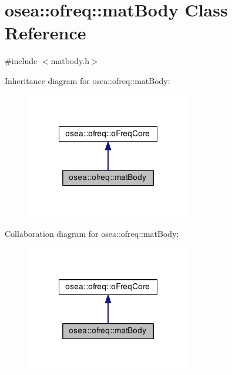 \hypertarget{classosea_1_1ofreq_1_1mat_body}{\section{osea\-:\-:ofreq\-:\-:mat\-Body Class Reference}
\label{classosea_1_1ofreq_1_1mat_body}
}


{\ttfamily \#include $<$matbody.\-h$>$}



Inheritance diagram for osea\-:\-:ofreq\-:\-:mat\-Body\-:
\nopagebreak
\begin{figure}[H]
\begin{center}
\leavevmode
\includegraphics[width=204pt]{classosea_1_1ofreq_1_1mat_body__inherit__graph}
\end{center}
\end{figure}


Collaboration diagram for osea\-:\-:ofreq\-:\-:mat\-Body\-:
\nopagebreak
\begin{figure}[H]
\begin{center}
\leavevmode
\includegraphics[width=204pt]{classosea_1_1ofreq_1_1mat_body__coll__graph}
\end{center}
\end{figure}
